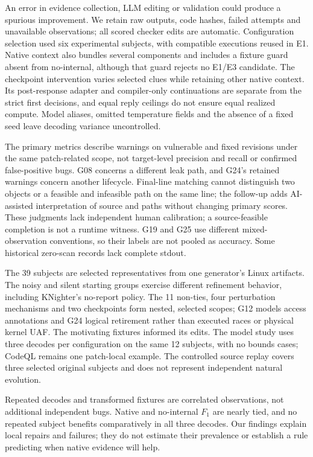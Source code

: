 An error in evidence collection, LLM editing or validation could produce a spurious improvement.
We retain raw outputs, code hashes, failed attempts and unavailable observations; all scored checker edits are automatic.
Configuration selection used six experimental subjects, with compatible executions reused in E1.
Native context also bundles several components and includes a fixture guard absent from no-internal, although that guard rejects no E1/E3 candidate.
The checkpoint intervention varies selected clues while retaining other native context.
Its post-response adapter and compiler-only continuations are separate from the strict first decisions, and equal reply ceilings do not ensure equal realized compute.
Model aliases, omitted temperature fields and the absence of a fixed seed leave decoding variance uncontrolled.

The primary metrics describe warnings on vulnerable and fixed revisions under the same patch-related scope, not target-level precision and recall or confirmed false-positive bugs.
G08 concerns a different leak path, and G24's retained warnings concern another lifecycle.
Final-line matching cannot distinguish two objects or a feasible and infeasible path on the same line; the follow-up adds AI-assisted interpretation of source and paths without changing primary scores.
These judgments lack independent human calibration; a source-feasible completion is not a runtime witness.
G19 and G25 use different mixed-observation conventions, so their labels are not pooled as accuracy.
Some historical zero-scan records lack complete stdout.

The 39 subjects are selected representatives from one generator's Linux artifacts.
The noisy and silent starting groups exercise different refinement behavior, including KNighter's no-report policy.
The 11 non-ties, four perturbation mechanisms and two checkpoints form nested, selected scopes; G12 models access annotations and G24 logical retirement rather than executed races or physical kernel UAF.
The motivating fixtures informed its edits.
The model study uses three decodes per configuration on the same 12 subjects, with no bounds cases; CodeQL remains one patch-local example.
The controlled source replay covers three selected original subjects and does not represent independent natural evolution.

Repeated decodes and transformed fixtures are correlated observations, not additional independent bugs.
Native and no-internal $F_1$ are nearly tied, and no repeated subject benefits comparatively in all three decodes.
Our findings explain local repairs and failures; they do not estimate their prevalence or establish a rule predicting when native evidence will help.
